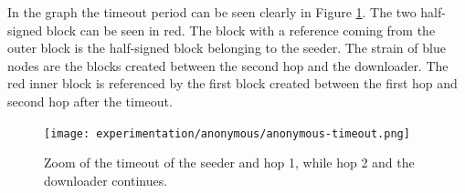 In the graph the timeout period can be seen clearly in Figure \ref{fig:synthetic-anonymous-timeout}.
The two half-signed block can be seen in red.
The block with a reference coming from the outer block is the half-signed block belonging to the seeder.
The strain of blue nodes are the blocks created between the second hop and the downloader.
The red inner block is referenced by the first block created between the first hop and second hop after the timeout.

\begin{figure}
	\centerline{\texttt{[image: experimentation/anonymous/anonymous-timeout.png]}}
	\caption{Zoom of the timeout of the seeder and hop 1, while hop 2 and the downloader continues.}
	\label{fig:synthetic-anonymous-timeout}
\end{figure}



